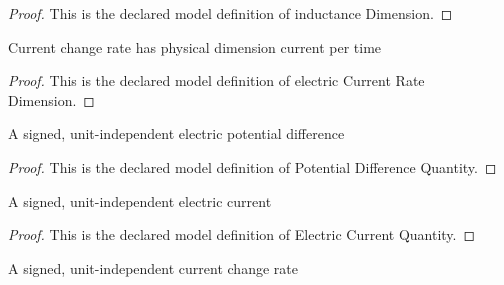 \begin{proof}
  This is the declared model definition of inductance Dimension.
\end{proof}
\begin{definition}
  \label{def:physics:phyx-mini-0988:phyxminiproblems-problemphyxmini0988-electriccurrentratedimension}
  Current change rate has physical dimension current per time
\end{definition}
\begin{proof}
  This is the declared model definition of electric Current Rate Dimension.
\end{proof}
\begin{definition}
  \label{def:physics:phyx-mini-0988:phyxminiproblems-problemphyxmini0988-potentialdifferencequantity}
  A signed, unit-independent electric potential difference
\end{definition}
\begin{proof}
  This is the declared model definition of Potential Difference Quantity.
\end{proof}
\begin{definition}
  \label{def:physics:phyx-mini-0988:phyxminiproblems-problemphyxmini0988-electriccurrentquantity}
  A signed, unit-independent electric current
\end{definition}
\begin{proof}
  This is the declared model definition of Electric Current Quantity.
\end{proof}
\begin{definition}
  \label{def:physics:phyx-mini-0988:phyxminiproblems-problemphyxmini0988-electriccurrentratequantity}
  A signed, unit-independent current change rate
\end{definition}
